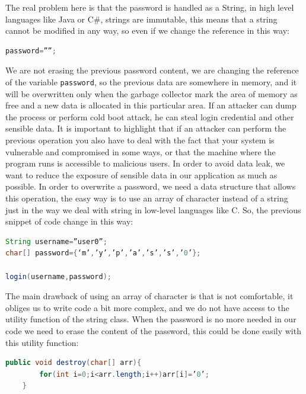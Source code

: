 The real problem here is that the password is handled as a String, in high level languages like Java or C\#, strings are immutable, this means that a string cannot be modified in any way, so even if we change the reference in this way:
\begin{lstlisting}[language=java]
password=””;
\end{lstlisting}

We are not erasing the previous password content, we are changing the reference of the variable \texttt{password}, so the previous data are somewhere in memory, and it will be overwritten only when the garbage collector mark the area of memory as free and a new data is allocated in this particular area.\newline
If an attacker can dump the process or perform cold boot attack, he can steal login credential and other sensible data.
It is important to highlight that if an attacker can perform the previous operation you also have to deal with the fact that your system is vulnerable and compromised in some ways, or that the machine where the program runs is accessible to malicious users.\newline
In order to avoid data leak, we want to reduce the exposure of sensible data in our application as much as possible.\newline
In order to overwrite a password, we need a data structure that allows this operation, the easy way is to use an array of character instead of a string just in the way we deal with string in low-level languages like C.\newline
So, the previous snippet of code change in this way:
\begin{lstlisting}[language=Java]
String username=”user0”;
char[] password={‘m’,’y’,’p’,’a’,’s’,’s’,’0’};

login(username,password);
\end{lstlisting}


The main drawback of using an array of character is that is not comfortable, it obliges us to write code a bit more complex, and we do not have access to the utility function of the string class.
When the password is no more needed in our code we need to erase the content of the password, this could be done easily with this utility function:
\begin{lstlisting}[language=Java]
	public void destroy(char[] arr){
		for(int i=0;i<arr.length;i++)arr[i]=’0’;
	}
\end{lstlisting}

